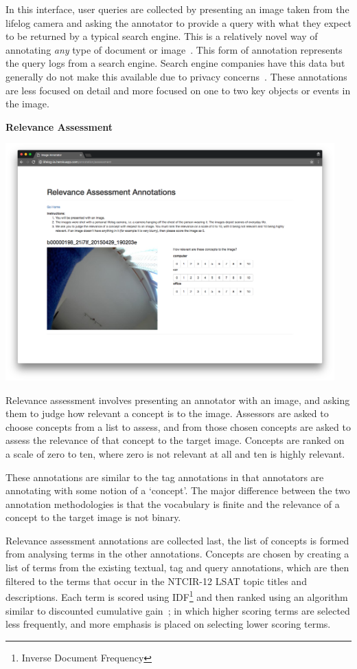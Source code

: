 In this interface, user queries are collected by presenting an image taken from the lifelog camera and asking the annotator to provide a query with what they expect to be returned by a typical search engine. This is a relatively novel way of annotating \textit{any} type of document or image~\cite{quteprints82599}. This form of annotation represents the query logs from a search engine. Search engine companies have this data but generally do not make this available due to privacy concerns~\cite{silvestri2010mining}. These annotations are less focused on detail and more focused on one to two key objects or events in the image.

\newpage
\textbf{Relevance Assessment}

\includegraphics[width=0.95\textwidth]{images/rel-ass-interface}

Relevance assessment involves presenting an annotator with an image, and asking them to judge how relevant a concept is to the image. Assessors are asked to choose concepts from a list to assess, and from those chosen concepts are asked to assess the relevance of that concept to the target image. Concepts are ranked on a scale of zero to ten, where zero is not relevant at all and ten is highly relevant.

These annotations are similar to the tag annotations in that annotators are annotating with some notion of a `concept'. The major difference between the two annotation methodologies is that the vocabulary is finite and the relevance of a concept to the target image is not binary.

Relevance assessment annotations are collected last, the list of concepts is formed from analysing terms in the other annotations. Concepts are chosen by creating a list of terms from the existing textual, tag and query annotations, which are then filtered to the terms that occur in the NTCIR-12 LSAT topic titles and descriptions. Each term is scored using IDF\footnote{Inverse Document Frequency} and then ranked using an algorithm similar to discounted cumulative gain~\cite{jarvelin2002cumulated}; in which higher scoring terms are selected less frequently, and more emphasis is placed on selecting lower scoring terms. 

